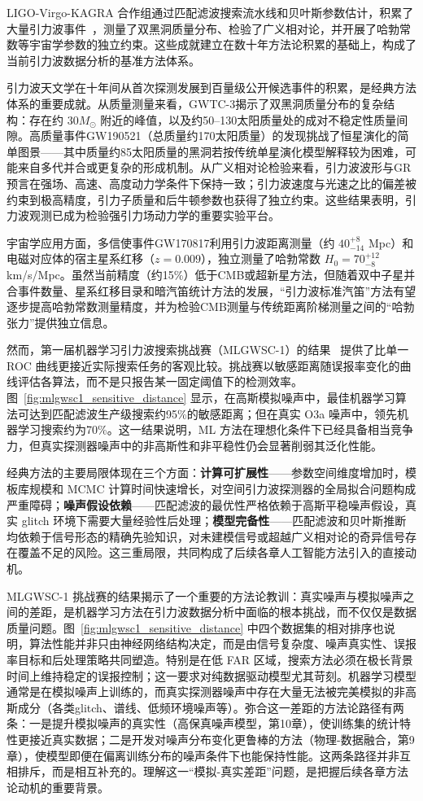 LIGO-Virgo-KAGRA 合作组通过匹配滤波搜索流水线和贝叶斯参数估计，积累了大量引力波事件~\cite{Abbott2021GWTC3,Abac2025GWTC4}，测量了双黑洞质量分布、检验了广义相对论，并开展了哈勃常数等宇宙学参数的独立约束。这些成就建立在数十年方法论积累的基础上，构成了当前引力波数据分析的基准方法体系。

引力波天文学在十年间从首次探测发展到百量级公开候选事件的积累，是经典方法体系的重要成就。从质量测量来看，GWTC-3揭示了双黑洞质量分布的复杂结构：存在约 $30M_\odot$ 附近的峰值，以及约50--130太阳质量处的成对不稳定性质量间隙。高质量事件GW190521（总质量约170太阳质量）的发现挑战了恒星演化的简单图景——其中质量约85太阳质量的黑洞若按传统单星演化模型解释较为困难，可能来自多代并合或更复杂的形成机制。从广义相对论检验来看，引力波波形与GR预言在强场、高速、高度动力学条件下保持一致；引力波速度与光速之比的偏差被约束到极高精度，引力子质量和后牛顿参数也获得了独立约束。这些结果表明，引力波观测已成为检验强引力场动力学的重要实验平台。

宇宙学应用方面，多信使事件GW170817利用引力波距离测量（约 $40^{+8}_{-14}$ Mpc）和电磁对应体的宿主星系红移（$z=0.009$），独立测量了哈勃常数 $H_0 = 70^{+12}_{-8}$ km/s/Mpc。虽然当前精度（约15\%）低于CMB或超新星方法，但随着双中子星并合事件数量、星系红移目录和暗汽笛统计方法的发展，“引力波标准汽笛”方法有望逐步提高哈勃常数测量精度，并为检验CMB测量与传统距离阶梯测量之间的“哈勃张力”提供独立信息。

然而，第一届机器学习引力波搜索挑战赛（MLGWSC-1）的结果~\cite{schafer2023mlgwsc1} 提供了比单一 ROC 曲线更接近实际搜索任务的客观比较。挑战赛以敏感距离随误报率变化的曲线评估各算法，而不是只报告某一固定阈值下的检测效率。图~\ref{fig:mlgwsc1_sensitive_distance} 显示，在高斯模拟噪声中，最佳机器学习算法可达到匹配滤波生产级搜索约95\%的敏感距离；但在真实 O3a 噪声中，领先机器学习搜索约为70\%。这一结果说明，ML 方法在理想化条件下已经具备相当竞争力，但真实探测器噪声中的非高斯性和非平稳性仍会显著削弱其泛化性能。

经典方法的主要局限体现在三个方面：\textbf{计算可扩展性}——参数空间维度增加时，模板库规模和 MCMC 计算时间快速增长，对空间引力波探测器的全局拟合问题构成严重障碍；\textbf{噪声假设依赖}——匹配滤波的最优性严格依赖于高斯平稳噪声假设，真实 glitch 环境下需要大量经验性后处理；\textbf{模型完备性}——匹配滤波和贝叶斯推断均依赖于信号形态的精确先验知识，对未建模信号或超越广义相对论的奇异信号存在覆盖不足的风险。这三重局限，共同构成了后续各章人工智能方法引入的直接动机。

MLGWSC-1 挑战赛的结果揭示了一个重要的方法论教训：真实噪声与模拟噪声之间的差距，是机器学习方法在引力波数据分析中面临的根本挑战，而不仅仅是数据质量问题。图~\ref{fig:mlgwsc1_sensitive_distance} 中四个数据集的相对排序也说明，算法性能并非只由神经网络结构决定，而是由信号复杂度、噪声真实性、误报率目标和后处理策略共同塑造。特别是在低 FAR 区域，搜索方法必须在极长背景时间上维持稳定的误报控制；这一要求对纯数据驱动模型尤其苛刻。机器学习模型通常是在模拟噪声上训练的，而真实探测器噪声中存在大量无法被完美模拟的非高斯成分（各类glitch、谱线、低频环境噪声等）。弥合这一差距的方法论路径有两条：一是提升模拟噪声的真实性（高保真噪声模型，第10章），使训练集的统计特性更接近真实数据；二是开发对噪声分布变化更鲁棒的方法（物理-数据融合，第9章），使模型即便在偏离训练分布的噪声条件下也能保持性能。这两条路径并非互相排斥，而是相互补充的。理解这一“模拟-真实差距”问题，是把握后续各章方法论动机的重要背景。

